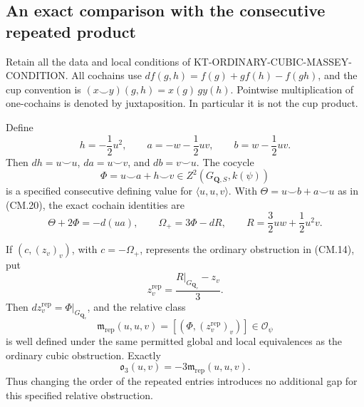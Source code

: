 \subsection{An exact comparison with the consecutive repeated product}
\label{sec:kt-cubic-shuffle}

Retain all the data and local conditions of
KT-ORDINARY-CUBIC-MASSEY-CONDITION.  All cochains use
\(df(g,h)=f(g)+g f(h)-f(gh)\), and the cup convention is
\((x\smile y)(g,h)=x(g)\,g y(h)\).
Pointwise multiplication of one-cochains is denoted by
juxtaposition.  In particular it is not the cup product.

\begin{proposition}
Define
\[
 h=-\frac12u^2,\qquad a=-w-\frac12uv,\qquad
 b=w-\frac12uv .                                      \tag{CS.1}
\]
Then \(dh=u\smile u\), \(da=u\smile v\), and
\(db=v\smile u\).  The cocycle
\[
 \Phi=u\smile a+h\smile v\in Z^2(G_{\mathbf Q,S},k(\psi))
                                                               \tag{CS.2}
\]
is a specified consecutive defining value for
\(\langle u,u,v\rangle\).  With
\(\Theta=u\smile b+a\smile u\) as in (CM.20), the exact
cochain identities are
\[
 \Theta+2\Phi=-d(ua),\qquad
 \Omega_+=3\Phi-dR,\qquad
 R=\frac32uw+\frac12u^2v.                              \tag{CS.3}
\]

If \((c,(z_v)_v)\), with \(c=-\Omega_+\), represents
the ordinary obstruction in (CM.14), put
\[
 z^{\mathrm{rep}}_v=\frac{R|_{G_{\mathbf Q_v}}-z_v}{3}.
                                                               \tag{CS.4}
\]
Then \(d z^{\mathrm{rep}}_v=\Phi|_{G_{\mathbf Q_v}}\),
and the relative class
\[
 \mathfrak m_{\mathrm{rep}}(u,u,v)
       =[(\Phi,(z^{\mathrm{rep}}_v)_v)]\in\mathcal O_\psi
                                                               \tag{CS.5}
\]
is well defined under the same permitted global and local
equivalences as the ordinary cubic obstruction.  Exactly
\[
             \mathfrak o_3(u,v)=-3\mathfrak m_{\mathrm{rep}}(u,u,v).
                                                               \tag{CS.6}
\]
Thus changing the order of the repeated entries introduces
no additional gap for this specified relative obstruction.
\end{proposition}


